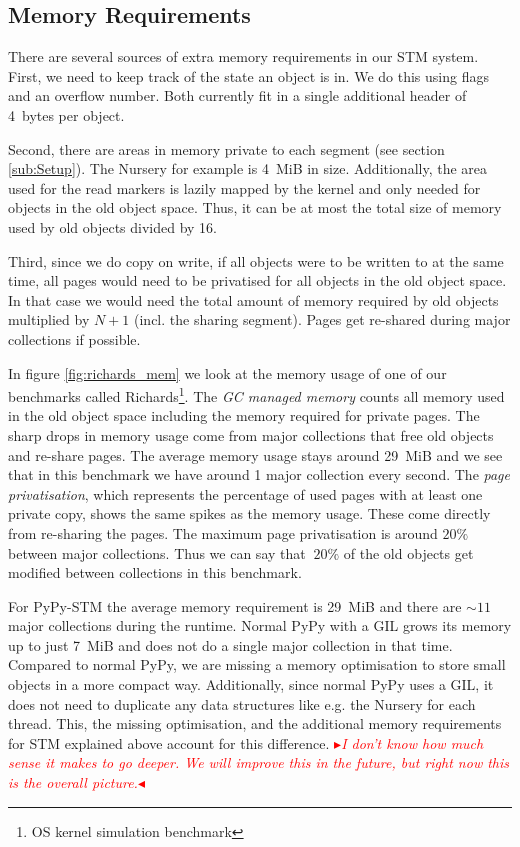 \documentclass{sigplanconf}
\newcommand{\mynote}[2]{%
  \textcolor{red}{%
    \fbox{\bfseries\sffamily\scriptsize#1}%
    {\small$\blacktriangleright$\textsf{\emph{#2}}$\blacktriangleleft$}%
  }%
}
\newcommand\remi[1]{\mynote{Remi}{#1}}
\begin{document}



\subsection{Memory Requirements}

There are several sources of extra memory requirements in our
STM system. First, we need to keep track of the state an object
is in. We do this using flags and an overflow number. Both currently
fit in a single additional header of 4~bytes per object.

Second, there are areas in memory private to each segment (see
section \ref{sub:Setup}). The Nursery for example is 4~MiB in
size. Additionally, the area used for the read markers is lazily
mapped by the kernel and only needed for objects in the old object
space. Thus, it can be at most the total size of memory used by
old objects divided by 16.

Third, since we do copy on write, if all objects were to be
written to at the same time, all pages would need to be privatised
for all objects in the old object space. In that case we would
need the total amount of memory required by old objects multiplied
by $N+1$ (incl. the sharing segment). Pages get re-shared during
major collections if possible.

In figure \ref{fig:richards_mem} we look at the memory usage of one of
our benchmarks called Richards\footnote{OS kernel simulation
benchmark}. The \emph{GC managed memory} counts all memory used in the
old object space including the memory required for private pages. The
sharp drops in memory usage come from major collections that free old
objects and re-share pages. The average memory usage stays around
29~MiB and we see that in this benchmark we have around 1 major
collection every second. The \emph{page privatisation}, which
represents the percentage of used pages with at least one private
copy, shows the same spikes as the memory usage. These come directly from
re-sharing the pages. The maximum page privatisation is around $20\%$
between major collections. Thus we can say that $~20\%$ of the old
objects get modified between collections in this benchmark.

For PyPy-STM the average memory requirement is 29~MiB and there are
$\sim 11$ major collections during the runtime. Normal PyPy with a GIL
grows its memory up to just 7~MiB and does not do a single major
collection in that time. Compared to normal PyPy, we are missing a
memory optimisation to store small objects in a more compact
way. Additionally, since normal PyPy uses a GIL, it does not need to
duplicate any data structures like e.g. the Nursery for each
thread. This, the missing optimisation, and the additional memory
requirements for STM explained above account for this difference.
\remi{I don't know how much sense it makes to go deeper. We will
improve this in the future, but right now this is the overall picture.}
\end{document}
